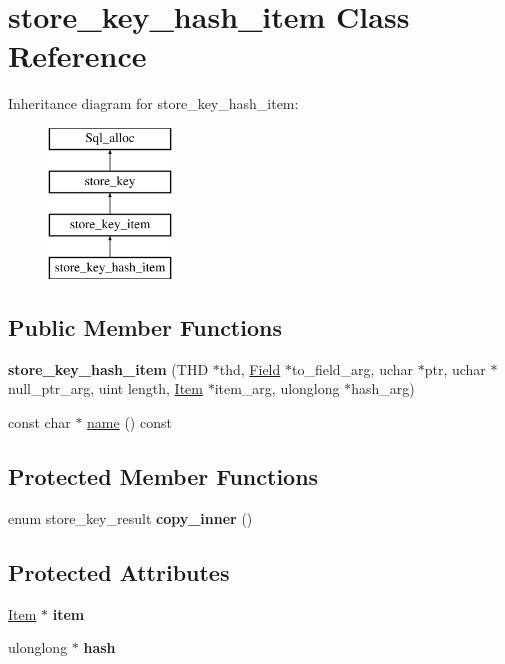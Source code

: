 \hypertarget{classstore__key__hash__item}{}\section{store\+\_\+key\+\_\+hash\+\_\+item Class Reference}
\label{classstore__key__hash__item}
Inheritance diagram for store\+\_\+key\+\_\+hash\+\_\+item\+:\begin{figure}[H]
\begin{center}
\leavevmode
\includegraphics[height=4.000000cm]{classstore__key__hash__item}
\end{center}
\end{figure}
\subsection*{Public Member Functions}
\begin{DoxyCompactItemize}
\item 
\mbox{\label{classstore__key__hash__item_a704d16761354179aaa1fab99cf566694}} 
{\bfseries store\+\_\+key\+\_\+hash\+\_\+item} (T\+HD $\ast$thd, \mbox{\hyperlink{classField}{Field}} $\ast$to\+\_\+field\+\_\+arg, uchar $\ast$ptr, uchar $\ast$null\+\_\+ptr\+\_\+arg, uint length, \mbox{\hyperlink{classItem}{Item}} $\ast$item\+\_\+arg, ulonglong $\ast$hash\+\_\+arg)
\item 
const char $\ast$ \mbox{\hyperlink{classstore__key__hash__item_a213002a48540add6652dfc3d908ee367}{name}} () const
\end{DoxyCompactItemize}
\subsection*{Protected Member Functions}
\begin{DoxyCompactItemize}
\item 
enum store\+\_\+key\+\_\+result {\bfseries copy\+\_\+inner} ()
\end{DoxyCompactItemize}
\subsection*{Protected Attributes}
\begin{DoxyCompactItemize}
\item 
\mbox{\label{classstore__key__hash__item_a7b6fdcd0afc26ffed76631c9d72c2601}} 
\mbox{\hyperlink{classItem}{Item}} $\ast$ {\bfseries item}
\item 
\mbox{\label{classstore__key__hash__item_aed71703ea07b12ba3ea56f2d24e807c3}} 
ulonglong $\ast$ {\bfseries hash}
\end{DoxyCompactItemize}
